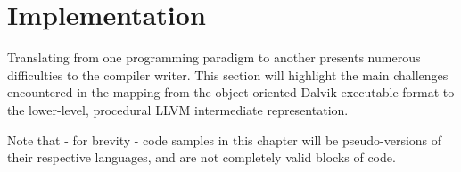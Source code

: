 \chapter{Implementation}
\label{chap:implementation}

Translating from one programming paradigm to another presents numerous difficulties to the compiler writer. This section will highlight the main challenges encountered in the mapping from the object-oriented Dalvik executable format to the lower-level, procedural LLVM intermediate representation.

Note that - for brevity - code samples in this chapter will be pseudo-versions of their respective languages, and are not completely valid blocks of code.















